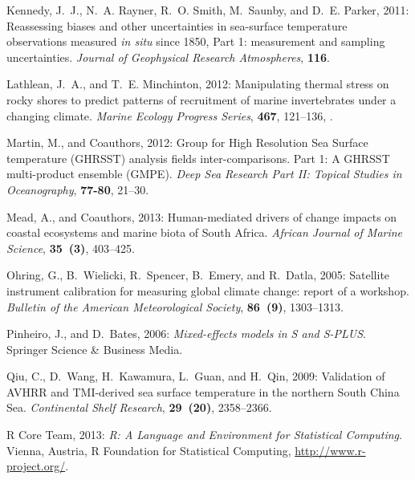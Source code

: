 \documentclass[]{ametsoc}
\begin{document}
\begin{thebibliography}{41}
Kennedy, J.~J., N.~A. Rayner, R.~O. Smith, M.~Saunby, and D.~E. Parker, 2011:
  {Reassessing biases and other uncertainties in sea-surface temperature
  observations measured \emph{in situ} since 1850, Part 1: measurement and
  sampling uncertainties}. \textit{Journal of Geophysical Research
  Atmospheres}, \textbf{116}.

Lathlean, J.~A., and T.~E. Minchinton, 2012: {Manipulating thermal stress on
  rocky shores to predict patterns of recruitment of marine invertebrates under
  a changing climate}. \textit{Marine Ecology Progress Series}, \textbf{467},
  121--136, .

Martin, M., and Coauthors, 2012: {Group for High Resolution Sea Surface
  temperature (GHRSST) analysis fields inter-comparisons. Part 1: A GHRSST
  multi-product ensemble (GMPE)}. \textit{Deep Sea Research Part II: Topical
  Studies in Oceanography}, \textbf{77-80}, 21--30.

Mead, A., and Coauthors, 2013: {Human-mediated drivers of change {\textemdash}
  impacts on coastal ecosystems and marine biota of South Africa}.
  \textit{African Journal of Marine Science}, \textbf{35~(3)}, 403--425.

Ohring, G., B.~Wielicki, R.~Spencer, B.~Emery, and R.~Datla, 2005: {Satellite
  instrument calibration for measuring global climate change: report of a
  workshop}. \textit{Bulletin of the American Meteorological Society},
  \textbf{86~(9)}, 1303--1313.

Pinheiro, J., and D.~Bates, 2006: \textit{Mixed-effects models in S and
  S-PLUS}. Springer Science \& Business Media.

Qiu, C., D.~Wang, H.~Kawamura, L.~Guan, and H.~Qin, 2009: {Validation of AVHRR
  and TMI-derived sea surface temperature in the northern South China Sea}.
  \textit{Continental Shelf Research}, \textbf{29~(20)}, 2358--2366.

{R Core Team}, 2013: \textit{{R: A Language and Environment for Statistical
  Computing}}. Vienna, Austria, R Foundation for Statistical Computing,
  \urlprefix\url{http://www.r-project.org/}.


\end{thebibliography}
\end{document}
